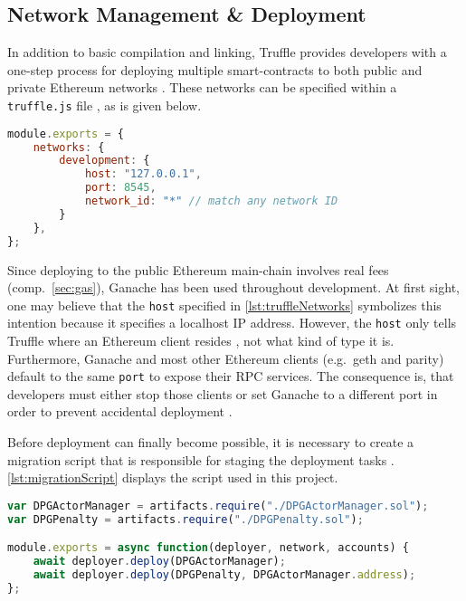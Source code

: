 \subsection{Network Management \& Deployment}
In addition to basic compilation and linking, Truffle provides developers with a one-step process for deploying multiple smart-contracts to both public and private Ethereum networks \cite[Truffle Overview]{truffleSuite}. These networks can be specified within a \texttt{truffle.js} file \cite[Configuration]{truffleSuite}, as is given below. 

\begin{lstlisting}[language=JavaScript, caption=Truffle network management, label=lst:truffleNetworks]
module.exports = {
	networks: {
		development: {
			host: "127.0.0.1",
			port: 8545,
			network_id: "*" // match any network ID
		}
	},
};
\end{lstlisting}

Since deploying to the public Ethereum main-chain involves real fees (comp.~\ref{sec:gas}), Ganache has been used throughout development. At first sight, one may believe that the \texttt{host} specified in \autoref{lst:truffleNetworks} symbolizes this intention because it specifies a localhost IP address. However, the \texttt{host} only tells Truffle where an Ethereum client resides \cite[Configuration]{truffleSuite}, not what kind of type it is. Furthermore, Ganache and most other Ethereum clients (e.g.~geth and parity) default to the same \texttt{port} to expose their RPC services. The consequence is, that developers must either stop those clients or set Ganache to a different port in order to prevent accidental deployment \cite[Deploying To The Live Network]{truffleSuite}.

Before deployment can finally become possible, it is necessary to create a migration script that is responsible for staging the deployment tasks \cite[Running Migrations]{truffleSuite}. \autoref{lst:migrationScript} displays the script used in this project.

\begin{lstlisting}[language=JavaScript, caption=Truffle migration script, label=lst:migrationScript]
var DPGActorManager = artifacts.require("./DPGActorManager.sol");
var DPGPenalty = artifacts.require("./DPGPenalty.sol");

module.exports = async function(deployer, network, accounts) {
	await deployer.deploy(DPGActorManager);
	await deployer.deploy(DPGPenalty, DPGActorManager.address);
};
\end{lstlisting}

